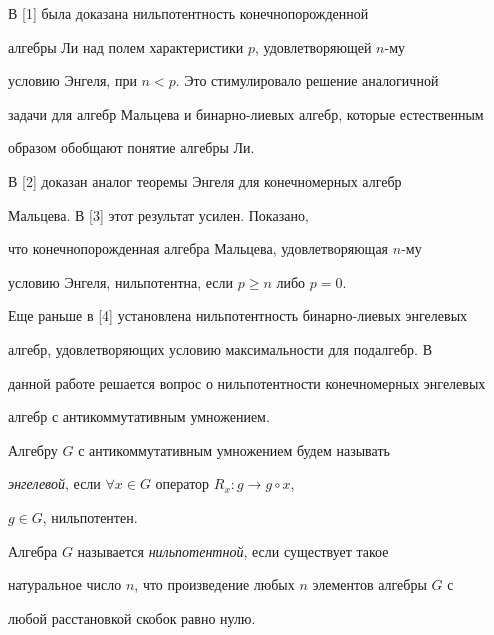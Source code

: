 \label{begin} 


 


 


В [1] была доказана нильпотентность конечнопорожденной 


алгебры Ли над полем характеристики $p$, удовлетворяющей $n$-му 


условию Энгеля, при $n<p$. Это стимулировало решение аналогичной 


задачи для алгебр Мальцева и бинарно-лиевых алгебр, которые естественным 


образом обобщают понятие алгебры Ли. 


В [2] доказан аналог теоремы Энгеля для конечномерных алгебр 


Мальцева. В [3] этот результат усилен. Показано, 


что конечнопорожденная алгебра Мальцева, удовлетворяющая $n$-му 


условию Энгеля, нильпотентна, если $p\ge n$ либо $p=0$. 


Еще раньше в [4] установлена нильпотентность бинарно-лиевых энгелевых 


алгебр, удовлетворяющих условию максимальности для подалгебр. В 


данной работе решается вопрос о нильпотентности конечномерных энгелевых 


алгебр с антикоммутативным умножением. 


 


\begin{defn} 


Алгебру $G$ с антикоммутативным умножением будем называть 


{\it энгелевой}, если $\forall x\in G$ оператор $R_x:g\to g\circ x$, 


$g\in G$, нильпотентен. 


\end{defn} 


 


\begin{defn} 


Алгебра $G$ называется {\it нильпотентной}, если существует такое 


натуральное число $n$, что произведение любых $n$ элементов алгебры $G$ с 


любой расстановкой скобок равно нулю. 


\end{defn} 


